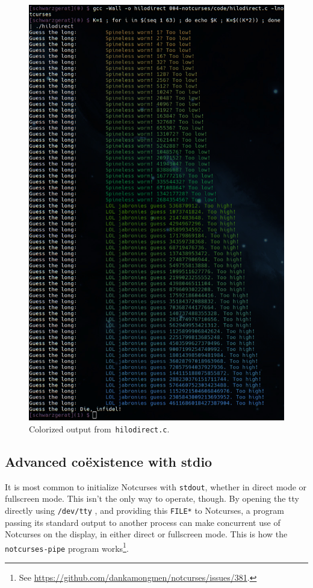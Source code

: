 \documentclass[letterpaper,10pt]{article}
\begin{document}
\begin{figure}[!htb]
\centering \includegraphics[width=.75\linewidth]{media/hilodirect.png}
\caption{Colorized output from~\texttt{hilodirect.c}.}
\label{fig:colorguess}
\end{figure}

\subsection{Advanced coëxistence with stdio}
It is most common to initialize Notcurses with \texttt{stdout}, whether in
direct mode or fullscreen mode. This isn't the only way to operate, though.
By opening the tty directly using \texttt{/dev/tty}%
, and providing
this \texttt{FILE*} to Notcurses, a program passing its standard output to
another process can make concurrent use of Notcurses on the display, in either
direct or fullscreen mode. This is how the \texttt{notcurses-pipe} program
works\footnote{See \url{https://github.com/dankamongmen/notcurses/issues/381}.}.
\end{document}
